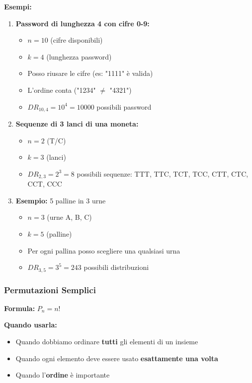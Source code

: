 \textbf{Esempi:}
\begin{enumerate}
    \item \textbf{Password di lunghezza 4 con cifre 0-9:}
    \begin{itemize}
        \item $n=10$ (cifre disponibili)
        \item $k=4$ (lunghezza password)
        \item Posso riusare le cifre (es: "1111" è valida)
        \item L'ordine conta ("1234" $\neq$ "4321")
        \item $DR_{10,4} = 10^4 = 10000$ possibili password
    \end{itemize}

    \item \textbf{Sequenze di 3 lanci di una moneta:}
    \begin{itemize}
        \item $n=2$ (T/C)
        \item $k=3$ (lanci)
        \item $DR_{2,3} = 2^3 = 8$ possibili sequenze: TTT, TTC, TCT, TCC, CTT, CTC, CCT, CCC
    \end{itemize}

    \item \textbf{Esempio:} 5 palline in 3 urne
    \begin{itemize}
        \item $n=3$ (urne A, B, C)
        \item $k=5$ (palline)
        \item Per ogni pallina posso scegliere una qualsiasi urna
        \item $DR_{3,5} = 3^5 = 243$ possibili distribuzioni
    \end{itemize}
\end{enumerate}

\subsubsection{Permutazioni Semplici}
\textbf{Formula:} $P_n = n!$

\textbf{Quando usarla:}
\begin{itemize}
    \item Quando dobbiamo ordinare \textbf{tutti} gli elementi di un insieme
    \item Quando ogni elemento deve essere usato \textbf{esattamente una volta}
    \item Quando l'\textbf{ordine} è importante
\end{itemize}

